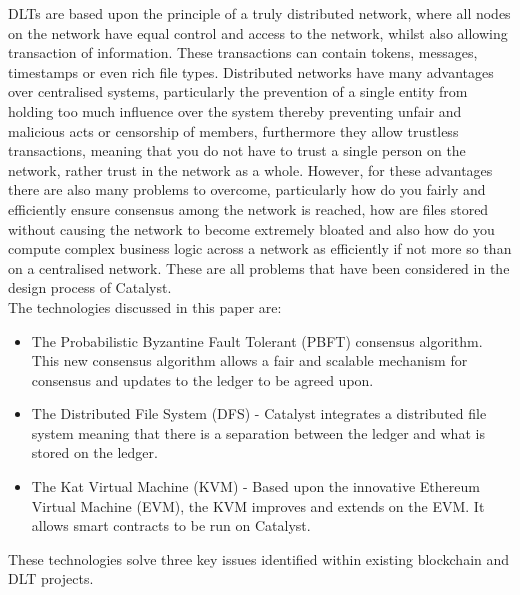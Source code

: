 DLTs are based upon the principle of a truly distributed network, where all nodes on the network have equal control and access to the network, whilst also allowing transaction of information. These transactions can contain tokens, messages, timestamps or even rich file types. Distributed networks have many advantages over centralised systems, particularly the prevention of a single entity from holding too much influence over the system thereby preventing unfair and malicious acts or censorship of members, furthermore they allow trustless transactions, meaning that you do not have to trust a single person on the network, rather trust in the network as a whole. However, for these advantages there are also many problems to overcome, particularly how do you fairly and efficiently ensure consensus among the network is reached, how are files stored without causing the network to become extremely bloated and also how do you compute complex business logic across a network as efficiently if not more so than on a centralised network. These are all problems that have been considered in the design process of Catalyst. \\

The technologies discussed in this paper are:

\begin{itemize}
\item The Probabilistic Byzantine Fault Tolerant (PBFT) consensus algorithm. This new consensus algorithm allows a fair and scalable mechanism for consensus and updates to the ledger to be agreed upon.
\item The Distributed File System (DFS) - Catalyst integrates a distributed file system meaning that there is a separation between the ledger and what is stored on the ledger.
\item The Kat Virtual Machine (KVM) - Based upon the innovative Ethereum Virtual Machine (EVM), the KVM improves and extends on the EVM. It allows smart contracts to be run on Catalyst. \\
\end{itemize}

These technologies solve three key issues identified within existing blockchain and DLT projects. \\

